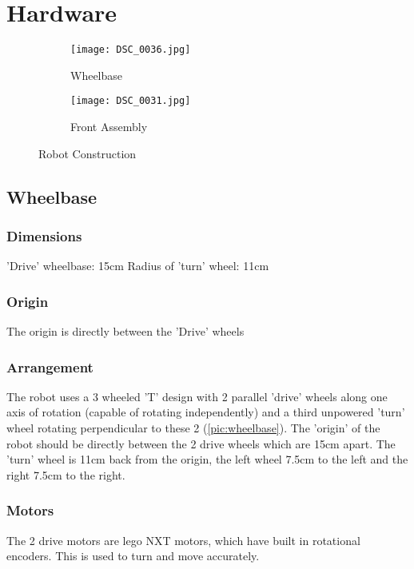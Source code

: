 \section{Hardware}

\begin{figure}[H]
\begin{subfigure}{.45\textwidth}
\centering
\texttt{[image: DSC\_0036.jpg]}
\caption{Wheelbase}
\label{pic:wheelbase}
\end{subfigure}
\begin{subfigure}{.45\textwidth}
\centering
\texttt{[image: DSC\_0031.jpg]}
\caption{Front Assembly}
\label{pic:front}
\end{subfigure}
\caption{Robot Construction}
\label{pic:construction}
\end{figure}

\subsection{Wheelbase}
\subsubsection{Dimensions}
'Drive' wheelbase:		15cm \newline
Radius of 'turn' wheel: 11cm
\subsubsection{Origin}
The origin is directly between the 'Drive' wheels
\subsubsection{Arrangement}
The robot uses a 3 wheeled 'T' design with 2 parallel 'drive' wheels along one axis of rotation (capable of rotating independently) and a third unpowered 'turn' wheel rotating perpendicular to these 2 (\autoref{pic:wheelbase}). The 'origin' of the robot should be 
directly between the 2 drive wheels which are 15cm apart. The 'turn' wheel 
is 11cm back from the origin, the left wheel 7.5cm to the left and the right
7.5cm to the right. 

\subsubsection{Motors}
The 2 drive motors are lego NXT motors, which have built in rotational encoders. This is used to turn and move accurately. 



